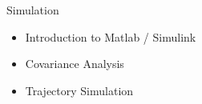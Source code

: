 \begin{frame}
Simulation
 \begin{itemize}
 \item Introduction to Matlab / Simulink
 \item Covariance Analysis
 \item Trajectory Simulation
\end{itemize}
\end{frame}



